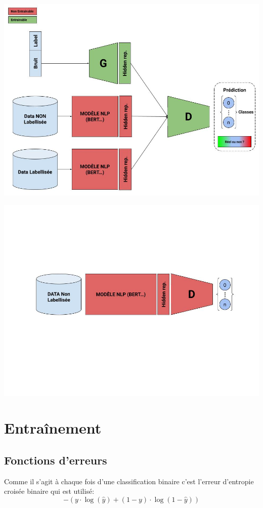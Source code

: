 \documentclass[francais,a4paper]{llncs} %
\begin{document}
	\includegraphics[width=\textwidth]{Architectutre_Entrainement.jpg}

	\includegraphics[width=\textwidth]{Architecture_Utilisation.jpg}
	
\section{Entraînement}

	\subsection{Fonctions d'erreurs}
	Comme il s'agit à chaque fois d'une classification binaire c'est l'erreur d'entropie croisée binaire qui est utilisé:
	\[-(y\cdot\log(\hat y) + (1 - y)\cdot\log(1 - \hat y))\]
\end{document}
